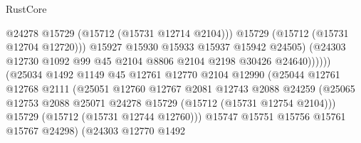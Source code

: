 \begin{lexlean}{RustCore}
\begin{coremodule}
                                            @24278
                                            @15729
                                            (@15712 (@15731 @12714 @2104)))
                                          @15729
                                          (@15712 (@15731 @12704 @12720)))
                                        @15927
                                        @15930
                                        @15933
                                        @15937
                                        @15942
                                        @24505)
                                      (@24303
                                        @12730
                                        @1092
                                        @99
                                        @45
                                        @2104
                                        @8806
                                        @2104
                                        @2198
                                        @30426
                                        @24640))))))
                            (@25034
                              @1492
                              @1149
                              @45
                              @12761
                              @12770
                              @2104
                              @12990
                              (@25044
                                @12761
                                @12768
                                @2111
                                (@25051
                                  @12760
                                  @12767
                                  @2081
                                  @12743
                                  @2088
                                  @24259
                                  (@25065
                                    @12753
                                    @2088
                                    @25071
                                    @24278
                                    @15729
                                    (@15712 (@15731 @12754 @2104)))
                                  @15729
                                  (@15712 (@15731 @12744 @12760)))
                                @15747
                                @15751
                                @15756
                                @15761
                                @15767
                                @24298)
                              (@24303
                                @12770
                                @1492

\end{coremodule}
\end{lexlean}

